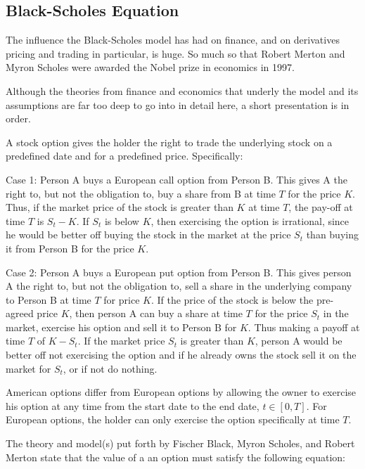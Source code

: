 \documentclass[]{article}
\begin{document}
\subsection{Black-Scholes Equation}\label{black-scholes-equation}

The influence the Black-Scholes model has had on finance, and on
derivatives pricing and trading in particular, is huge. So much so that
Robert Merton and Myron Scholes were awarded the Nobel prize in
economics in 1997. \citep{Hull}

Although the theories from finance and economics that underly the model
and its assumptions are far too deep to go into in detail here, a short
presentation is in order.

A stock option gives the holder the right to trade the underlying stock
on a predefined date and for a predefined price. Specifically:

Case 1: Person A buys a European call option from Person B. This gives A
the right to, but not the obligation to, buy a share from B at time
\(T\) for the price \(K\). Thus, if the market price of the stock is
greater than \(K\) at time \(T\), the pay-off at time \(T\) is
\(S_t - K\). If \(S_t\) is below \(K\), then exercising the option is
irrational, since he would be better off buying the stock in the market
at the price \(S_t\) than buying it from Person B for the price \(K\).

Case 2: Person A buys a European put option from Person B. This gives
person A the right to, but not the obligation to, sell a share in the
underlying company to Person B at time \(T\) for price \(K\). If the
price of the stock is below the pre-agreed price \(K\), then person A
can buy a share at time \(T\) for the price \(S_t\) in the market,
exercise his option and sell it to Person B for \(K\). Thus making a
payoff at time \(T\) of \(K - S_t\). If the market price \(S_t\) is
greater than \(K\), person A would be better off not exercising the
option and if he already owns the stock sell it on the market for
\(S_t\), or if not do nothing.

American options differ from European options by allowing the owner to
exercise his option at any time from the start date to the end date,
\(t \in [0, T]\). For European options, the holder can only exercise the
option specifically at time \(T\).

The theory and model(s) put forth by Fischer Black, Myron Scholes, and
Robert Merton state that the value of a an option must satisfy the
following equation:
\end{document}
